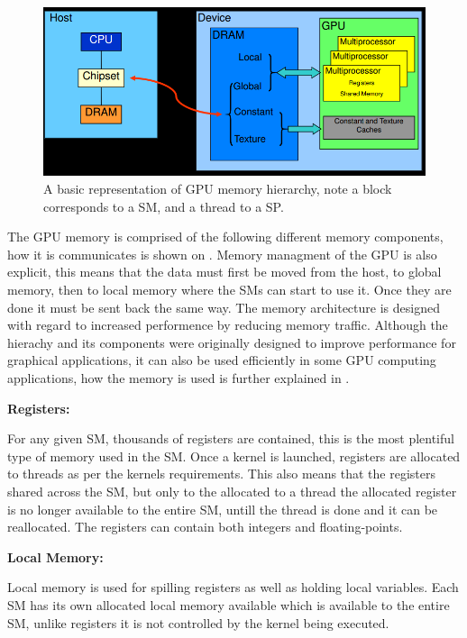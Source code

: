 \begin{figure}[h!]
\centering
 \includegraphics[width=1\textwidth]{figures/GPUMemoryClear.png} %
\caption{A basic representation of GPU memory hierarchy, note a block corresponds to a SM, and a thread to a SP.}\label{image:GPUMemory} 
\end{figure}
The GPU memory is comprised of the following different memory components, how it is communicates is shown on . 
Memory managment of the GPU is also explicit, this means that the data must first be moved from the host, to global memory, then to local memory where the SMs can start to use it. 
Once they are done it must be sent back the same way.
The memory architecture is designed with regard to increased performence by reducing memory traffic.
Although the hierachy and its components were originally designed to improve performance for graphical applications, it can also be used efficiently in some GPU computing applications, how the memory is used is further explained in . %

\textbf{Registers:}

For any given SM, thousands of registers are contained, this is the most plentiful type of memory used in the SM. 
Once a kernel is launched, registers are allocated to threads as per the kernels requirements.
This also means that the registers shared across the SM, but only to the allocated to a thread the allocated register is no longer available to the entire SM, untill the thread is done and it can be reallocated.
The registers can contain both integers and floating-points.

\textbf{Local Memory:}

Local memory is used for spilling registers as well as holding local variables.
Each SM has its own allocated local memory available which is available to the entire SM, unlike registers it is not controlled by the kernel being executed.


